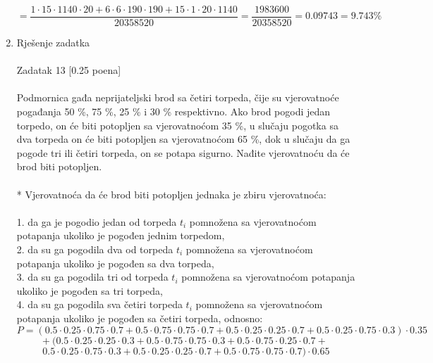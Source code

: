 \documentclass[12pt]{article}
\begin{document}
\begin{enumerate}
\begin{equation*}
    = \frac{1 \cdot 15 \cdot 1140 \cdot 20 + 6 \cdot 6 \cdot 190 \cdot 190 + 15 \cdot 1 \cdot 20 \cdot 1140}{20358520} = \frac{1983600}{20358520} = 0.09743 = 9.743 \%
\end{equation*}
		\item Rješenje zadatka \\
		\\
		Zadatak 13 [0.25 poena] \\
		\\
Podmornica gađa neprijateljski brod sa četiri torpeda, čije su vjerovatnoće
pogađanja 50 \%, 75 \%, 25 \% i 30 \% respektivno. Ako brod pogodi jedan
torpedo, on će biti potopljen sa vjerovatnoćom 35 \%, u slučaju pogotka sa dva
torpeda on će biti potopljen sa vjerovatnoćom 65 \%, dok u slučaju da ga
pogode tri ili četiri torpeda, on se potapa sigurno. Nađite vjerovatnoću da će
brod biti potopljen.
\\
\\
* Vjerovatnoća da će brod biti potopljen jednaka je zbiru vjerovatnoća: \\
\\
1. da ga je pogodio jedan od torpeda $t_i$ pomnožena sa vjerovatnoćom
potapanja ukoliko je pogođen jednim torpedom, \\
2. da su ga pogodila dva od torpeda $t_i$ pomnožena sa vjerovatnoćom potapanja ukoliko je pogođen sa dva torpeda,\\
3. da su ga pogodila tri od torpeda $t_i$ pomnožena sa vjerovatnoćom potapanja ukoliko je pogođen sa tri torpeda,\\
4. da su ga pogodila sva četiri torpeda $t_i$ pomnožena sa vjerovatnoćom potapanja ukoliko je pogođen sa četiri torpeda, odnosno: \\
\begin{equation*}
    P = (0.5 \cdot 0.25 \cdot 0.75 \cdot 0.7 +
         0.5 \cdot 0.75 \cdot 0.75 \cdot 0.7 +
         0.5 \cdot 0.25 \cdot 0.25 \cdot 0.7 +
         0.5 \cdot 0.25 \cdot 0.75 \cdot 0.3) \cdot 0.35
\end{equation*}
\begin{equation*}
     + ~(0.5 \cdot 0.25 \cdot 0.25 \cdot 0.3 +
         0.5 \cdot 0.75 \cdot 0.75 \cdot 0.3 +
         0.5 \cdot 0.75 \cdot 0.25 \cdot 0.7 +~
\end{equation*}
\begin{equation*}
         0.5 \cdot 0.25 \cdot 0.75 \cdot 0.3 +
         0.5 \cdot 0.25 \cdot 0.25 \cdot 0.7 +
         0.5 \cdot 0.75 \cdot 0.75 \cdot 0.7) \cdot 0.65

\end{equation*}
\end{enumerate}
\end{document}

